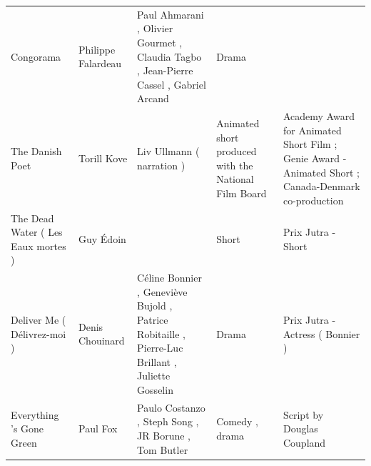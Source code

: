 \documentclass{article}
\begin{document}
\begin{tabular}{lllll}
Congorama & Philippe Falardeau & Paul Ahmarani , Olivier Gourmet , Claudia Tagbo , Jean-Pierre Cassel , Gabriel Arcand & Drama &  \\
The Danish Poet & Torill Kove & Liv Ullmann ( narration ) & Animated short produced with the National Film Board & Academy Award for Animated Short Film ; Genie Award - Animated Short ; Canada-Denmark co-production \\
The Dead Water ( Les Eaux mortes ) & Guy Édoin &  & Short & Prix Jutra - Short \\
Deliver Me ( Délivrez-moi ) & Denis Chouinard & Céline Bonnier , Geneviève Bujold , Patrice Robitaille , Pierre-Luc Brillant , Juliette Gosselin & Drama & Prix Jutra - Actress ( Bonnier ) \\
Everything 's Gone Green & Paul Fox & Paulo Costanzo , Steph Song , JR Borune , Tom Butler & Comedy , drama & Script by Douglas Coupland \\
\bottomrule
\end{tabular}
\end{document}
